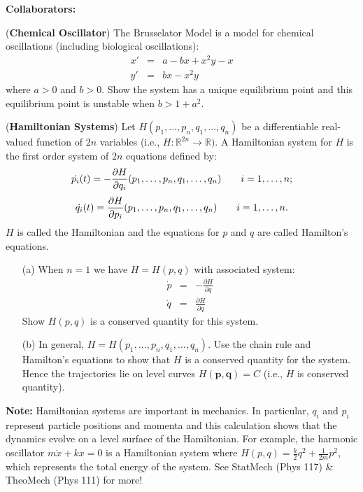 \documentclass[11pt,letterpaper,boxed]{hmcpset}
\begin{document}
\noindent\textbf{Collaborators:} 


\begin{problem}[1.] (\textbf{Chemical Oscillator}) The Brusselator Model is a model for chemical oscillations (including biological oscillations):
\begin{eqnarray}
\label{al2}
x' & = & a - b x + x^2 y - x \\
\label{be2}
y' & = & b x - x^2 y
\end{eqnarray}
where $a > 0$ and $b > 0$.  Show the system has a unique equilibrium point and this equilibrium point is unstable when $b > 1 + a^2$.
\end{problem}

\begin{solution}
\vfill
\end{solution}
\newpage


\begin{problem}[2.]  (\textbf{Hamiltonian Systems}) Let $H(p_1, ..., p_n, q_1, ..., q_n)$ be a differentiable real-valued function of $2n$ variables (i.e., $H:\mathbb{R}^{2n} \rightarrow \mathbb{R})$.  A Hamiltonian system for $H$ is  the first order system of $2n$ equations defined by:
$$\dot{p_i}(t) = -{\partial H \over \partial q_i}(p_1,\ldots,p_n,q_1,\ldots,q_n) \qquad i = 1,\dots, n;$$
$$\dot{q_i}(t) = {\partial H \over \partial p_i}(p_1,\ldots,p_n,q_1,\ldots,q_n)  \qquad i = 1,\dots, n. $$
$H$ is called the Hamiltonian and the equations for $p$ and $q$ are called Hamilton's equations. 

\begin{enumerate}
\item[(a)] When $n=1$ we have $H = H(p,q)$ with associated  system:
\begin{eqnarray*}
 \dot{p} & = &  -\frac{\partial H}{\partial q} \\
 \dot{q} & = &  \frac{\partial H}{\partial q} 
 \end{eqnarray*}
 Show $H(p,q)$ is a conserved quantity for this system. 
\item[(b)] In general,  $H = H(p_1, ..., p_n, q_1, ..., q_n)$. Use the chain rule and Hamilton's equations to show that $H$ is a conserved quantity for the system.  Hence the trajectories lie on level curves $H(\mathbf{p},\mathbf{q}) = C$ (i.e., $H$ is conserved quantity).  
\end{enumerate}

\noindent
\textbf{Note:}  Hamiltonian systems are important in mechanics.  In particular, $q_i$ and $p_i$ represent particle positions and momenta and this calculation shows that the dynamics evolve on a level surface of the Hamiltonian.   For example, the harmonic oscillator $m \ddot{x} + k x = 0$ is a Hamiltonian system where $H(p,q)=\frac{k}{2} q^2 + \frac{1}{2m} p^2$, which represents the total energy of the system.  See StatMech (Phys 117) \& TheoMech (Phys 111) for more!

\end{problem}
\end{document}
